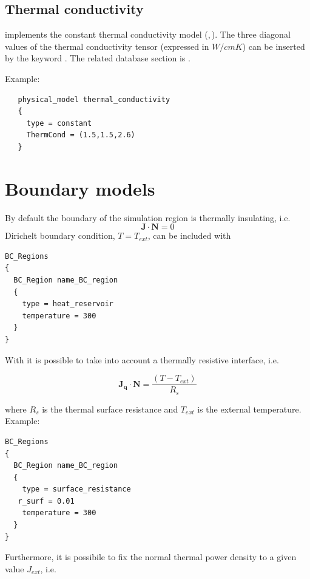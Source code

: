 \subsection{Thermal conductivity}

 implements the constant thermal conductivity model (,\,). The three diagonal values of the thermal conductivity tensor (expressed in $W/{cm K}$) can be inserted by the keyword . The related database section is .

Example:
\begin{verbatim}
   physical_model thermal_conductivity
   {		
     type = constant
     ThermCond = (1.5,1.5,2.6)
   }
\end{verbatim}

\section{Boundary models}

By default the boundary of the simulation region is thermally insulating, i.e. 
\begin{equation}\label{TH}
\mathbf{J}\cdot \mathbf{N} = 0
\end{equation}
Dirichelt boundary condition, $T = T_{ext}$, can be included with 
\begin{verbatim}
BC_Regions
{
  BC_Region name_BC_region
  {
    type = heat_reservoir
    temperature = 300
  }
}
\end{verbatim}

With  it is possible to take into account a thermally resistive interface, i.e.

\begin{equation}\label{TH}
\mathbf{J_q}\cdot \mathbf{N} =  \frac{(T - T_{ext})}{R_s}
\end{equation}

where $R_s$ is the thermal surface resistance and $T_{ext}$ is the external temperature.
Example:

\begin{verbatim}
BC_Regions
{
  BC_Region name_BC_region
  {
    type = surface_resistance
   r_surf = 0.01
    temperature = 300
  }
}
\end{verbatim}


Furthermore, it is possibile to fix the normal thermal power density to a  given value $J_{ext}$, i.e.

